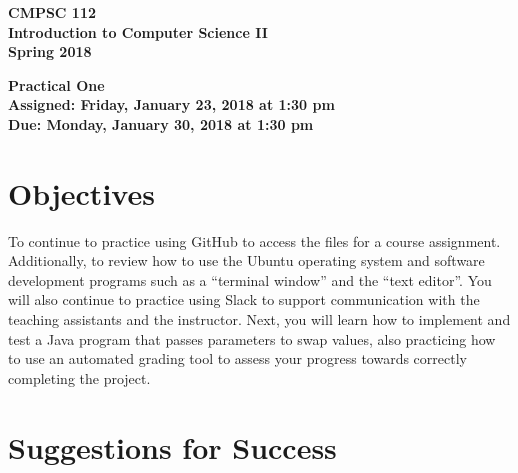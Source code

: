 \documentclass[11pt]{article}
\newcommand{\assignmentduedate}{January 30}
\newcommand{\assignmentassignedate}{January 23}
\newcommand{\assignmentnumber}{One}
\newcommand{\labyear}{2018}
\newcommand{\labdueday}{Monday}
\newcommand{\labassignday}{Friday}
\newcommand{\labtime}{1:30 pm}
\newcommand{\assigneddate}{Assigned: \labassignday, \assignmentassignedate, \labyear{} at \labtime{}}
\newcommand{\duedate}{Due: \labdueday, \assignmentduedate, \labyear{} at \labtime{}}
\newcommand{\labtitle}[1]
{
  \begin{center}
    \begin{center}
      \bf
      CMPSC 112\\Introduction to Computer Science II\\
      Spring 2018\\
      \medskip
    \end{center}
    \bf
    #1
  \end{center}
}
\begin{document}
\thispagestyle{empty}

\labtitle{Practical \assignmentnumber{} \\ \assigneddate{} \\ \duedate{}}

\section*{Objectives}

To continue to practice using GitHub to access the files for a course
assignment. Additionally, to review how to use the Ubuntu operating system and
software development programs such as a ``terminal window'' and the ``text
editor''. You will also continue to practice using Slack to support
communication with the teaching assistants and the instructor. Next, you will
learn how to implement and test a Java program that passes parameters to swap
values, also practicing how to use an automated grading tool to assess your
progress towards correctly completing the project.

\section*{Suggestions for Success}
\end{document}
